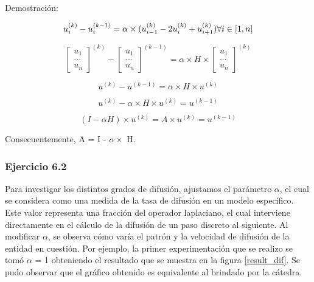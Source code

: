 Demostración:

\begin{equation}
u_{i}^{(k)} - u_{i}^{(k-1)} = \alpha \times (u_{i-1}^{(k)} - 2u_{i}^{(k)} + u_{i+1}^{(k)}) \space \forall i \in [1, n]
\end{equation}

\begin{equation}
\begin{bmatrix}
u_{1}\\
...\\
u_{n}
\end{bmatrix}^{(k)}
-
\begin{bmatrix}
u_{1}\\
...\\
u_{n}
\end{bmatrix}^{(k-1)}
=
\alpha \times H \times
\begin{bmatrix}
u_{1}\\
...\\
u_{n}
\end{bmatrix}^{(k)}
\end{equation}

\begin{equation}
u^{(k)} - u^{(k-1)} = \alpha \times H \times u^{(k)}
\end{equation}

\begin{equation}
u^{(k)} - \alpha \times H \times u^{(k)} =  u^{(k-1)}
\end{equation}

\begin{equation}
(I - \alpha H) \times u^{(k)} = A \times u^{(k)} =  u^{(k-1)}
\end{equation}

Consecuentemente, A = I - $\alpha \times$ H.

\subsubsection{Ejercicio 6.2}
Para investigar los distintos grados de difusión, ajustamos el parámetro $\alpha$, el cual se considera como una medida de la tasa de difusión en un modelo específico. Este valor representa una fracción del operador laplaciano, el cual interviene directamente en el cálculo de la difusión de un paso discreto al siguiente.
Al modificar $\alpha$, se observa cómo varía el patrón y la velocidad de difusión de la entidad en cuestión. Por ejemplo, la primer experimentación que se realizo se tomó $\alpha$ = 1 obteniendo el resultado que se muestra en la figura \ref{result_dif}. Se pudo observar que el gráfico obtenido es equivalente al brindado por la cátedra.

